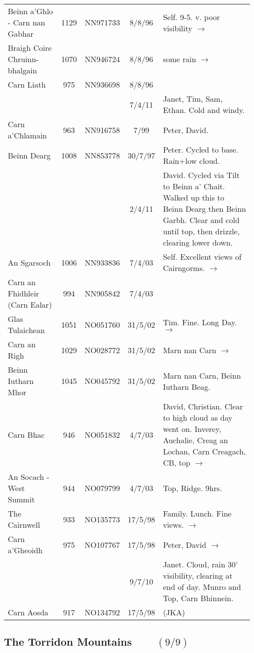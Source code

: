 \documentclass[10pt,a4paper]{article}
\begin{document}
\begin{tabular}{p{3.9cm}cccp{6cm}}
Beinn a'Ghlo - Carn nan Gabhar & 1129 & NN971733 &8/8/96&Self. 9-5. v. poor visibility $\rightarrow$\\
Braigh Coire Chruinn-bhalgain & 1070  & NN946724 &8/8/96& some rain $\rightarrow$ \\
Carn Liath & 975 & NN936698 &8/8/96&\\
&&&7/4/11&Janet, Tim, Sam, Ethan. Cold and windy.\\
Carn a'Chlamain & 963  & NN916758 &7/99& Peter, David.   \\
Beinn Dearg & 1008 & NN853778 &30/7/97&Peter. Cycled to base. Rain+low cloud.\\
&&&2/4/11&David. Cycled via  Tilt to Beinn a' Chait. Walked up this to Beinn Dearg
then Beinn Garbh. Clear and cold until top, then drizzle, clearing lower down.\\
An Sgarsoch & 1006 & NN933836 &7/4/03& Self. Excellent views of Cairngorms. $\rightarrow$\\
Carn an Fhidhleir (Carn Ealar) & 994 & NN905842 &7/4/03& \\
Glas Tulaichean  & 1051 & NO051760  &31/5/02& Tim. Fine. Long Day. $\rightarrow$   \\
Carn an Righ & 1029  & NO028772 &31/5/02& Marn nan Carn $\rightarrow$\\
Beinn Iutharn Mhor  & 1045 & NO045792 &31/5/02& Marn nan Carn, Beinn Iutharn Beag.\\
Carn Bhac & 946  & NO051832 &4/7/03& David, Christian. Clear to high cloud as day went on.
Inverey, Auchalie, Creag an Lochan, Carn Creagach, CB, top $\rightarrow$    \\
An Socach - West Summit & 944 & NO079799 &4/7/03& Top, Ridge. 9hrs.\\
The Cairnwell & 933  & NO135773 &17/5/98& Family. Lunch. Fine views. $\rightarrow$  \\
Carn a'Gheoidh & 975  & NO107767 &17/5/98& Peter, David $\rightarrow$ \\
&&&9/7/10&Janet. Cloud, rain 30' visibility, clearing at
 end of day. Munro and
Top, Carn Bhinnein.\\
Carn Aosda & 917 & NO134792 &17/5/98& (JKA)\\

\end{tabular}

\newpage

\subsection*{The Torridon Mountains $\qquad (9/9)$}
\end{document}
